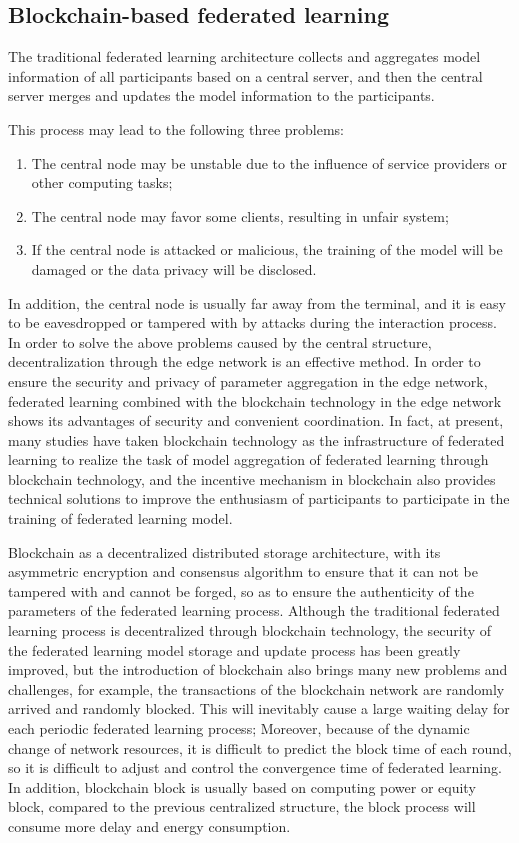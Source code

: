 \documentclass[lettersize,journal]{IEEEtran}
\begin{document}
\subsection{Blockchain-based federated learning}
The traditional federated learning architecture collects and aggregates model information of all participants based on a central server, and then the central server merges and updates the model information to the participants. 

This process may lead to the following three problems: 
\begin{enumerate}
\item The central node may be unstable due to the influence of service providers or other computing tasks; 
\item The central node may favor some clients, resulting in unfair system; 
\item If the central node is attacked or malicious, the training of the model will be damaged or the data privacy will be disclosed. 
\end{enumerate}
In addition, the central node is usually far away from the terminal, and it is easy to be eavesdropped or tampered with by attacks during the interaction process. In order to solve the above problems caused by the central structure, decentralization through the edge network is an effective method. In order to ensure the security and privacy of parameter aggregation in the edge network, federated learning combined with the blockchain technology in the edge network shows its advantages of security and convenient coordination. In fact, at present, many studies have taken blockchain technology as the infrastructure of federated learning to realize the task of model aggregation of federated learning through blockchain technology, and the incentive mechanism in blockchain also provides technical solutions to improve the enthusiasm of participants to participate in the training of federated learning model.

Blockchain as a decentralized distributed storage architecture, with its asymmetric encryption and consensus algorithm to ensure that it can not be tampered with and cannot be forged, so as to ensure the authenticity of the parameters of the federated learning process. Although the traditional federated learning process is decentralized through blockchain technology, the security of the federated learning model storage and update process has been greatly improved, but the introduction of blockchain also brings many new problems and challenges, for example, the transactions of the blockchain network are randomly arrived and randomly blocked. This will inevitably cause a large waiting delay for each periodic federated learning process; Moreover, because of the dynamic change of network resources, it is difficult to predict the block time of each round, so it is difficult to adjust and control the convergence time of federated learning. In addition, blockchain block is usually based on computing power or equity block, compared to the previous centralized structure, the block process will consume more delay and energy consumption.
\end{document}
